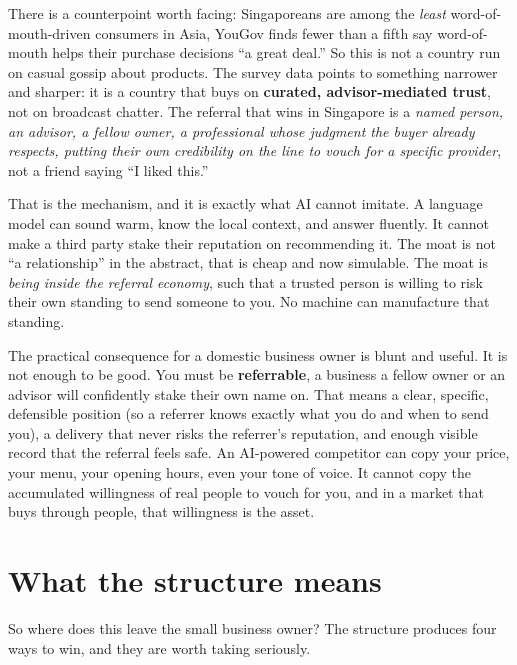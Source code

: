 \documentclass[10pt,twoside,openany]{memoir}
\newcommand{\needspacehead}{\needspace{4\baselineskip}}
\let\oldsection\section
\renewcommand{\section}{\needspacehead\oldsection}
\begin{document}
{{{{{{{{{{{{{{There is a counterpoint worth facing: Singaporeans are among the
\emph{least} word-of-mouth-driven consumers in Asia, YouGov finds fewer
than a fifth say word-of-mouth helps their purchase decisions ``a great
deal.'' So this is not a country run on casual gossip about products.
The survey data points to something narrower and sharper: it is a
country that buys on \textbf{curated, advisor-mediated trust}, not on
broadcast chatter. The referral that wins in Singapore is a \emph{named
person, an advisor, a fellow owner, a professional whose judgment the
buyer already respects, putting their own credibility on the line to
vouch for a specific provider}, not a friend saying ``I liked this.''

That is the mechanism, and it is exactly what AI cannot imitate. A
language model can sound warm, know the local context, and answer
fluently. It cannot make a third party stake their reputation on
recommending it. The moat is not ``a relationship'' in the abstract,
that is cheap and now simulable. The moat is \emph{being inside the
referral economy}, such that a trusted person is willing to risk their
own standing to send someone to you. No machine can manufacture that
standing.

The practical consequence for a domestic business owner is blunt and
useful. It is not enough to be good. You must be \textbf{referrable}, a
business a fellow owner or an advisor will confidently stake their own
name on. That means a clear, specific, defensible position (so a
referrer knows exactly what you do and when to send you), a delivery
that never risks the referrer's reputation, and enough visible record
that the referral feels safe. An AI-powered competitor can copy your
price, your menu, your opening hours, even your tone of voice. It cannot
copy the accumulated willingness of real people to vouch for you, and in
a market that buys through people, that willingness is the asset.

\section{What the structure means}\label{what-the-structure-means}

So where does this leave the small business owner? The structure
produces four ways to win, and they are worth taking seriously.

}}}}}}}}}}}}}}
\end{document}
